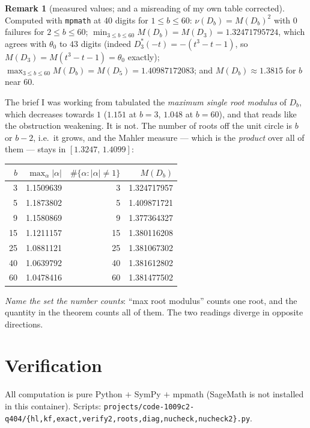 \documentclass[11pt]{article}
\theoremstyle{definition}
\newtheorem{remark}[theorem]{Remark}
\begin{document}
\begin{remark}[measured values; and a misreading of my own table corrected]
\label{rem:numbers}
Computed with \texttt{mpmath} at $40$ digits for $1\le b\le 60$:
$\nu(D_b)=M(D_b)^{2}$ with $0$ failures for $2\le b\le60$;
$\min_{3\le b\le60}M(D_b)=M(D_3)=1.32471795724$, which agrees with $\theta_0$ to
$43$ digits (indeed $D_3^{*}(-t)=-(t^{3}-t-1)$, so $M(D_3)=M(t^{3}-t-1)=\theta_0$ exactly);
$\max_{3\le b\le60}M(D_b)=M(D_5)=1.40987172083$; and $M(D_b)\approx1.3815$ for $b$ near $60$.

The brief I was working from tabulated the \emph{maximum single root modulus} of $D_b$, which
decreases towards $1$ ($1.151$ at $b=3$, $1.048$ at $b=60$), and that reads like the obstruction
weakening. It is not. The number of roots off the unit circle is $b$ or $b-2$, i.e.\ it grows, and
the Mahler measure --- which is the \emph{product} over all of them --- stays in
$[1.3247,\,1.4099]$:
\begin{center}
\begin{tabular}{rrrr}
\toprule
$b$ & $\max_\alpha|\alpha|$ & $\#\{\alpha:|\alpha|\ne1\}$ & $M(D_b)$\\
\midrule
 3 & 1.1509639 &  3 & 1.324717957\\
 5 & 1.1873802 &  5 & 1.409871721\\
 9 & 1.1580869 &  9 & 1.377364327\\
15 & 1.1211157 & 15 & 1.380116208\\
25 & 1.0881121 & 25 & 1.381067302\\
40 & 1.0639792 & 40 & 1.381612802\\
60 & 1.0478416 & 60 & 1.381477502\\
\bottomrule
\end{tabular}
\end{center}
\emph{Name the set the number counts}: ``max root modulus'' counts one root, and the quantity in
the theorem counts all of them. The two readings diverge in opposite directions.
\end{remark}

\section{Verification}\label{sec:verif}

All computation is pure Python $+$ SymPy $+$ mpmath (SageMath is not installed in this container).
Scripts: \texttt{projects/code-1009c2-q404/\{hl,kf,exact,verify2,roots,diag,nucheck,nucheck2\}.py}.
\end{document}
